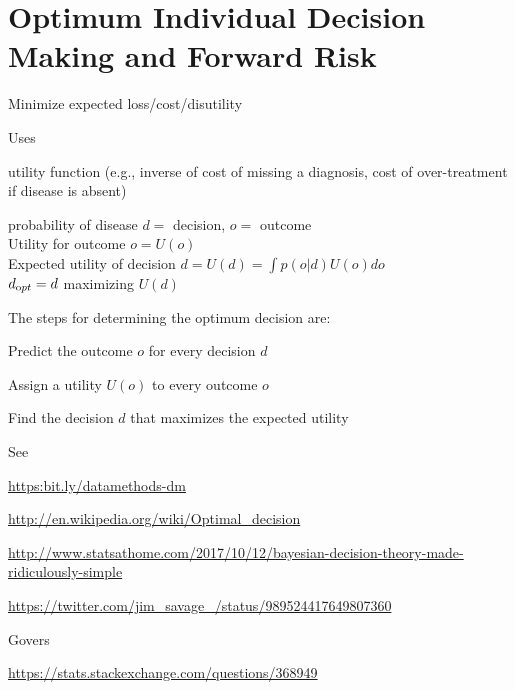 \section{Optimum Individual Decision Making and Forward Risk}
\bi
\item Minimize expected loss/cost/disutility
\item Uses
 \bi
 \item utility function (e.g., inverse of cost of missing a diagnosis, cost of
 over-treatment if disease is absent)
 \item probability of disease
 \ei
\ei
$d =$ decision, $o =$ outcome\\
Utility for outcome $o = U(o)$\\
Expected utility of decision $d = U(d) = \int p(o | d) U(o)do$\\
$d_{\textrm opt} = d$ maximizing $U(d)$

The steps for determining the optimum decision are:
\be
\item Predict the outcome $o$ for every decision $d$
\item Assign a utility $U(o)$ to every outcome $o$
\item Find the decision $d$ that maximizes the expected utility
\ee

See
\bi
\item \url{https:bit.ly/datamethods-dm}
\item \url{http://en.wikipedia.org/wiki/Optimal_decision}
\item \url{http://www.statsathome.com/2017/10/12/bayesian-decision-theory-made-ridiculously-simple}
\item \url{https://twitter.com/jim_savage_/status/989524417649807360}
\item Govers~\etal~\cite{gov18int}
\item \url{https://stats.stackexchange.com/questions/368949}
\ei



